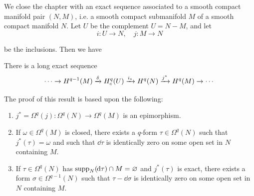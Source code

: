 We close the chapter with an exact sequence associated to a smooth compact
manifold pair $(N, M)$, i.e. a smooth compact submanifold $M$ of a smooth compact
manifold $N$. Let $U$ be the complement $U = N - M$, and let 
\[
  i:U\to N, \quad j:M\to N
\]

be the inclusions. Then we have
\begin{proposition}\label{proposition:13-11}
  There is a long exact sequence
  \[
    \cdots\ra H^{q-1}(M) \xra[\delta]H_c^q(U)\xra[i_*] H^q(N)\xra[j^*] H^q(M)\ra\cdots
  \]
\end{proposition}

The proof of this result is based upon the following:
\begin{lemma}\label{lemma:13-12}
  \begin{enumerate}
    \item $j^*=\Omega^q(j):\Omega^q(N)\to\Omega^q(M)$ is an epimorphism.
    \item If $\omega\in\Omega^q(M)$ is closed, there exists a $q$-form $\tau\in\Omega^q(N)$ such that 
      $j^*(\tau)=\omega$ and such that $\dd\tau$ is identically zero on some open set in $N$ containing $M$.
    \item If $\tau\in\Omega^q(N)$ has $\supp_N(\!\dd\tau)\cap M=\ns$ and $j^*(\tau)$ is exact, there exists a form $\sigma\in\Omega^{q-1}(N)$
      such that $\tau-\dd\sigma$ is identically zero on some open set in $N$ containing $M$.
  \end{enumerate}
\end{lemma}


